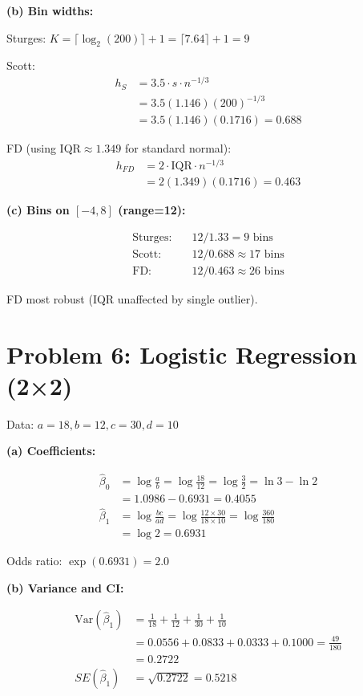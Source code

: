 \documentclass[10pt,twocolumn]{article}
\begin{document}
\textbf{(b) Bin widths:}

Sturges: \(K = \lceil \log_2(200) \rceil + 1 = \lceil 7.64 \rceil + 1 = 9\)

Scott:
\begin{align*}
h_S &= 3.5 \cdot s \cdot n^{-1/3} \\
&= 3.5(1.146)(200)^{-1/3} \\
&= 3.5(1.146)(0.1716) = 0.688
\end{align*}

FD (using \(\text{IQR} \approx 1.349\) for standard normal):
\begin{align*}
h_{FD} &= 2 \cdot \text{IQR} \cdot n^{-1/3} \\
&= 2(1.349)(0.1716) = 0.463
\end{align*}

\textbf{(c) Bins on \([-4,8]\) (range=12):}

\begin{align*}
\text{Sturges:} &\quad 12/1.33 = 9 \text{ bins} \\
\text{Scott:} &\quad 12/0.688 \approx 17 \text{ bins} \\
\text{FD:} &\quad 12/0.463 \approx 26 \text{ bins}
\end{align*}

FD most robust (IQR unaffected by single outlier).

\section*{Problem 6: Logistic Regression (2×2)}

Data: \(a=18, b=12, c=30, d=10\)

\textbf{(a) Coefficients:}

\begin{align*}
\hat{\beta}_0 &= \log\frac{a}{b} = \log\frac{18}{12} = \log\frac{3}{2} = \ln 3 - \ln 2 \\
&= 1.0986 - 0.6931 = \boxed{0.4055} \\
\hat{\beta}_1 &= \log\frac{bc}{ad} = \log\frac{12 \times 30}{18 \times 10} = \log\frac{360}{180} \\
&= \log 2 = \boxed{0.6931}
\end{align*}

Odds ratio: \(\exp(0.6931) = \boxed{2.0}\)

\textbf{(b) Variance and CI:}

\begin{align*}
\text{Var}(\hat{\beta}_1) &= \frac{1}{18} + \frac{1}{12} + \frac{1}{30} + \frac{1}{10} \\
&= 0.0556 + 0.0833 + 0.0333 + 0.1000 = \frac{49}{180} \\
&= 0.2722 \\
SE(\hat{\beta}_1) &= \sqrt{0.2722} = 0.5218
\end{align*}
\end{document}

